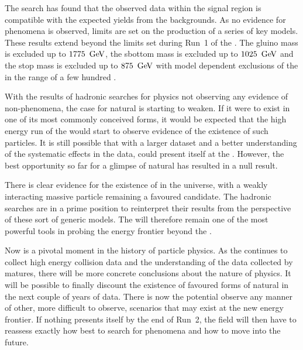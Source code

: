 The search has found that the observed data within the signal region
is compatible with the expected yields from the \SM backgrounds. As no
evidence for \BSM phenomena is observed, limits are set on the
production of a series of key \SUSY models. These results extend
beyond the limits set during Run~1 of the \LHC. The gluino mass is
excluded up to $1775~\mathrm{\,Ge\kern -0.1em V}$, the sbottom mass is excluded up to
$1025~\mathrm{\,Ge\kern -0.1em V}$ and the stop mass is excluded up to $875~\mathrm{\,Ge\kern -0.1em V}$ with model
dependent exclusions of the \LSP in the range of a few hundred \gev.

With the results of hadronic searches for \BSM physics not observing
any evidence of non-\SM phenomena, the case for natural \SUSY is
starting to weaken. If it were to exist in one of its most commonly
conceived forms, it would be expected that the high energy run of the
\LHC would start to observe evidence of the existence of such \SUSY
particles. It is still possible that with a larger dataset and a
better understanding of the systematic effects in the data, \SUSY could present
itself at the \LHC. However, the best opportunity so far for a glimpse of
natural \SUSY has resulted in a null result. 

There is clear evidence for the existence of \DM in the universe, with
a weakly interacting massive particle remaining a favoured candidate.
The hadronic \SUSY searches are in a prime position to reinterpret
their results from the perspective of these sort of generic \DM
models. The \LHC will therefore remain one of the most powerful tools
in probing the energy frontier beyond the \SM.

Now is a pivotal moment in the history of particle physics. As the
\LHC continues to collect high energy collision data and the
understanding of the data collected by \CMS matures, there will be
more concrete conclusions about the nature of \BSM physics.  It will
be possible to finally discount the existence of favoured forms of
natural \SUSY in the next couple of years of \LHC data. There is now
the potential observe any manner of other, more difficult to observe,
\BSM scenarios that may exist at the new energy frontier. If nothing
presents itself by the end of Run~2, the field will then have to
reassess exactly how best to search for \BSM phenomena and how to move
into the future.

